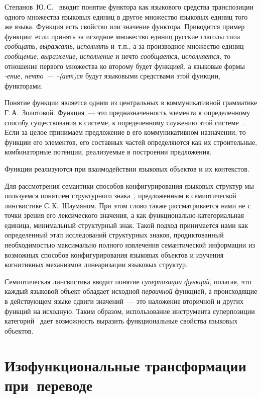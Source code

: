 \begin{multicols}{2}
Степанов~Ю.\,С.~\cite{21koz} вводит понятие функтора как языкового средства 
транспозиции одного множества языковых единиц в другое множество языковых 
единиц того же языка. Функция есть свойство или значение функтора. Приводится 
пример функции: если принять за исходное множество единиц русские глаголы типа 
\textit{сообщать}, \textit{выражать}, \textit{исполнять} и~т.п., а за 
производное множество единиц \textit{сообщение}, \textit{выражение}, 
\textit{исполнение} и нечто \textit{сообщается}, \textit{исполняется}, то 
отношение первого множества ко второму будет функцией, а языковые формы 
\textit{-ение, нечто~---   -(ает)ся} будут языковыми средствами этой функции, 
функторами.

Понятие функции является одним из центральных в коммуникативной
грамматике Г.\,А.~Золотовой. Функция~--- это предназначенность элемента к
определенному способу существования в системе, к определенному
служению этой системе~\cite{24koz}. Если за целое принимаем
предложение в его коммуникативном назначении, то функции его элементов,
его составных частей определяются как их строительные, комбинаторные
потенции, реализуемые в построении предложения.

Функции реализуются при взаимодействии языковых объектов и их
контекстов.

Для рассмотрения семантики способов конфи\-гу\-ри\-ро\-ва\-ния языковых 
структур мы пользуемся понятием структурного знака~\cite{25koz}, предложенным в 
семиотической лингвистике С.\,К.~Шаумяном. При этом слово также рассматривается 
нами не с точки зрения его лексического зна\-чения, а как 
функционально-категориальная единица, мини\-маль\-ный структурный знак. Такой 
подход прини\-ма\-ет\-ся нами как определенный этап исследований структурных 
знаков, продиктованный не\-об\-хо\-ди\-мостью максимально полного извлечения 
семан\-ти\-че\-ской информации из возможных способов конфигурирования языковых 
объектов и изучения когнитивных механизмов линеаризации языковых структур.

Семиотическая лингвистика вводит понятие \textit{суперпозиции
функций}, полагая, что каждый языковой объект обладает исходной
\textit{первичной} функцией, а происходящие в действующем языке сдвиги
значений~--- это наложение вторичной и других функций на исходную.
Таким образом, использование инструмента суперпозиции
категорий~\cite{26koz, 27koz} дает возможность выразить функциональные
свойства языковых объектов.

\section{Изофункциональные трансформации при~переводе}


\end{multicols}
